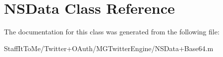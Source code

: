 \hypertarget{class_n_s_data}{
\section{\-N\-S\-Data \-Class \-Reference}
\label{class_n_s_data}
}


\-The documentation for this class was generated from the following file\-:\begin{DoxyCompactItemize}
\item 
\-Staff\-It\-To\-Me/\-Twitter+\-O\-Auth/\-M\-G\-Twitter\-Engine/\-N\-S\-Data+\-Base64.\-m\end{DoxyCompactItemize}
